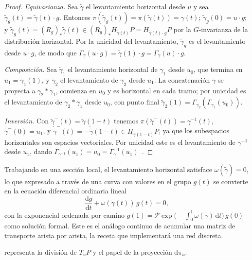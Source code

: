 \begin{proof}
\emph{Equivarianza.} Sea $\tilde\gamma$ el levantamiento horizontal desde $u$ y
sea $\tilde\gamma_g(t) = \tilde\gamma(t) \cdot g$. Entonces $\pi(\tilde\gamma_g(t))
= \pi(\tilde\gamma(t)) = \gamma(t)$; $\tilde\gamma_g(0) = u \cdot g$; y
$\dot{\tilde\gamma}_g(t) = (R_g)_* \dot{\tilde\gamma}(t) \in (R_g)_*
H_{\tilde\gamma(t)} P = H_{\tilde\gamma(t)\cdot g} P$ por la $G$-invarianza de la
distribuci\'on horizontal. Por la unicidad del levantamiento, $\tilde\gamma_g$ es
el levantamiento desde $u \cdot g$, de modo que $\Gamma_\gamma(u \cdot g) =
\tilde\gamma(1)\cdot g = \Gamma_\gamma(u)\cdot g$.

\emph{Composici\'on.} Sea $\tilde\gamma_1$ el levantamiento horizontal de
$\gamma_1$ desde $u_0$, que termina en $u_1 = \tilde\gamma_1(1)$, y
$\tilde\gamma_2$ el levantamiento de $\gamma_2$ desde $u_1$. La concatenaci\'on
$\tilde\gamma$ se proyecta a $\gamma_2 * \gamma_1$, comienza en $u_0$ y es
horizontal en cada tramo; por unicidad es el levantamiento de $\gamma_2 *
\gamma_1$ desde $u_0$, con punto final $\tilde\gamma_2(1) =
\Gamma_{\gamma_2}(\Gamma_{\gamma_1}(u_0))$.

\emph{Inversi\'on.} Con $\tilde\gamma^-(t) = \tilde\gamma(1-t)$ tenemos
$\pi(\tilde\gamma^-(t)) = \gamma^{-1}(t)$, $\tilde\gamma^-(0) = u_1$, y
$\dot{\tilde\gamma}^-(t) = -\dot{\tilde\gamma}(1-t) \in H_{\tilde\gamma(1-t)} P$,
ya que los subespacios horizontales son espacios vectoriales. Por unicidad este
es el levantamiento de $\gamma^{-1}$ desde $u_1$, dando
$\Gamma_{\gamma^{-1}}(u_1) = u_0 =
\Gamma_\gamma^{-1}(u_1)$~\citep[Ch.~II, Prop.~3.2]{Kobayashi1996}.
\end{proof}

Trabajando en una secci\'on local, el levantamiento horizontal satisface
$\omega(\dot{\tilde\gamma}) = 0$, lo que expresado a trav\'es de una curva con
valores en el grupo $g(t)$ se convierte en la ecuaci\'on diferencial ordinaria
lineal
\[
  \frac{\mathrm{d}g}{\mathrm{d}t} + \omega(\dot\gamma(t))\, g(t) = 0,
\]
con la exponencial ordenada por camino
$g(1) = \mathcal{P}\exp\!\big(-\!\int_0^1 \omega(\dot\gamma)\,\mathrm{d}t\big)\,g(0)$
como soluci\'on formal. Este es el an\'alogo continuo de acumular una matriz de
transporte arista por arista, la receta que implementar\'a una red discreta.

 representa la divisi\'on de $T_u P$ y el
papel de la proyecci\'on $\mathrm{d}\pi_u$.

